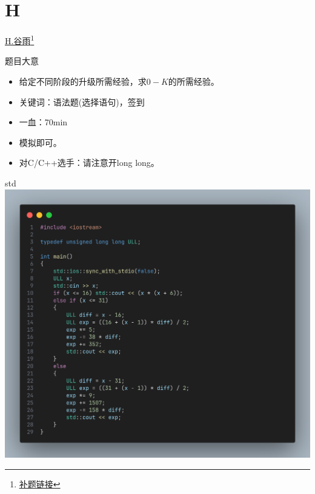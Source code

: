 \documentclass{beamer}
\begin{document}
    \section{H}
    \hypertarget{H}{}
    \begin{frame}{\hyperlink{toc}{H.谷雨}\footnote{\href{https://acm816.cn/p/243}{\underline{补题链接}}}}
        \begin{block}{题目大意}
            \begin{itemize}
                \item 给定不同阶段的升级所需经验，求$0-K$的所需经验。
                \item 关键词：语法题(选择语句)，签到
                \item 一血：70min
            \end{itemize}
        \end{block}
        \begin{itemize}
            \item 模拟即可。
            \item 对C/C++选手：请注意开long long。
        \end{itemize}
    \end{frame}
    \begin{frame}{std}
        \centering\includegraphics[scale=0.18]{images/std/H.png}
    \end{frame}
\end{document}
